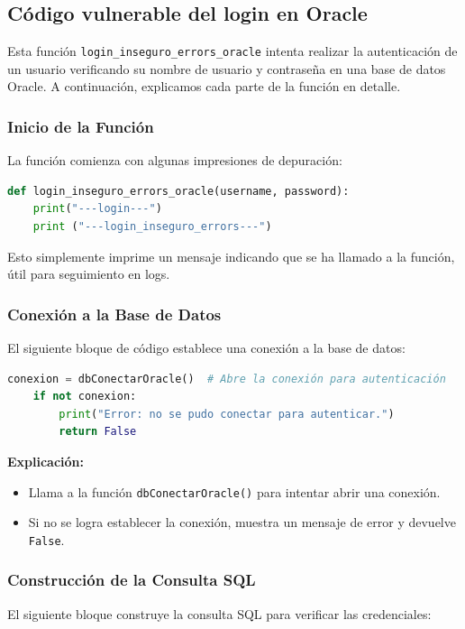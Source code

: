 \documentclass[a4paper,12pt]{article}
\begin{document}
\subsection{Código vulnerable del login en Oracle}
Esta función \texttt{login\_inseguro\_errors\_oracle} intenta realizar la autenticación de un usuario verificando su nombre de usuario y contraseña en una base de datos Oracle. A continuación, explicamos cada parte de la función en detalle.

\subsubsection{Inicio de la Función}
La función comienza con algunas impresiones de depuración:

\begin{lstlisting}[language=Python]
def login_inseguro_errors_oracle(username, password):
    print("---login---")
    print ("---login_inseguro_errors---")
\end{lstlisting}

Esto simplemente imprime un mensaje indicando que se ha llamado a la función, útil para seguimiento en logs.

\subsubsection{Conexión a la Base de Datos}
El siguiente bloque de código establece una conexión a la base de datos:

\begin{lstlisting}[language=Python]
    conexion = dbConectarOracle()  # Abre la conexión para autenticación
    if not conexion:
        print("Error: no se pudo conectar para autenticar.")
        return False
\end{lstlisting}

\textbf{Explicación:}
\begin{itemize}
    \item Llama a la función \texttt{dbConectarOracle()} para intentar abrir una conexión.
    \item Si no se logra establecer la conexión, muestra un mensaje de error y devuelve \texttt{False}.
\end{itemize}

\subsubsection{Construcción de la Consulta SQL}
El siguiente bloque construye la consulta SQL para verificar las credenciales:
\end{document}
